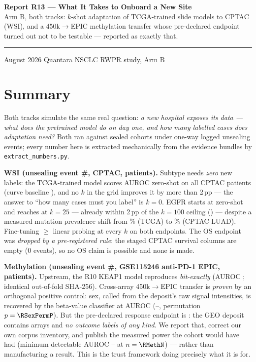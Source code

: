 \documentclass[11pt,a4paper]{article}
\begin{document}
\thispagestyle{empty}
\noindent
{\large\bfseries\color{qnavy} Report R13 --- What It Takes to Onboard a New Site}\\[2pt]
{\color{qgrey}Arm B, both tracks: $k$-shot adaptation of TCGA-trained slide models to CPTAC
(WSI), and a 450k$\rightarrow$EPIC methylation transfer whose pre-declared endpoint turned out
not to be testable --- reported as exactly that.}\\[6pt]
{\color{qgrey}\rule{\textwidth}{0.4pt}}

\medskip
{} August 2026 \quad\textbullet\quad Quantara \quad\textbullet\quad
NSCLC RWPR study, Arm B

\section*{Summary}

Both tracks simulate the same real question: \emph{a new hospital exposes its data --- what
does the pretrained model do on day one, and how many labelled cases does adaptation need?}
Both ran against sealed cohorts under one-way logged unsealing events; every number here is
extracted mechanically from the evidence bundles by \texttt{extract\_numbers.py}.

\textbf{WSI (unsealing event \#\RWsiUnsealNum, CPTAC, \RNCptacSubtype{} patients).} Subtype
needs \emph{zero} new labels: the TCGA-trained model scores AUROC \RSubZeroFull{} zero-shot on
all \RSubZeroFullN{} CPTAC patients (curve baseline \RSubFtZero), and no $k$ in the grid
improves it by more than 2\,pp --- the answer to ``how many cases must you label'' is
$k=0$. EGFR starts at \REgfrFtZero{} zero-shot and reaches \REgfrFtTwentyFive{} at
$k=25$ --- already within 2\,pp of the $k=100$ ceiling (\REgfrFtHundred) --- despite a
measured mutation-prevalence shift from \RShiftTcgaPct\% (TCGA) to \RShiftCptacPct\%
(CPTAC-LUAD). Fine-tuning $\geq$ linear probing at every $k$ on both endpoints. The OS
endpoint was \emph{dropped by a pre-registered rule}: the staged CPTAC survival columns are
empty (0 events), so no OS claim is possible and none is made.

\textbf{Methylation (unsealing event \#\RMethUnsealNum, GSE115246 anti-PD-1 EPIC,
\RMethN{} patients).} Upstream, the R10 KEAP1 model reproduces \emph{bit-exactly} (AUROC
\RReproAuroc; identical out-of-fold SHA-256). Cross-array 450k$\rightarrow$EPIC transfer is
\emph{proven} by an orthogonal positive control: sex, called from the deposit's raw signal
intensities, is recovered by the beta-value classifier at AUROC \RSexAuroc{}
(\RSexLo--\RSexHi, permutation $p=\RSexPermP$). But the pre-declared response endpoint is
\textbf{\REOneStatus}: the GEO deposit contains arrays and \emph{no outcome labels of any
kind}. We report that, correct our own corpus inventory, and publish the measured power the
cohort would have had (minimum detectable AUROC \RMdeMin--\RMdeMax{} at $n=\RMethN$) ---
rather than manufacturing a result. This is the trust framework doing precisely what it is
for.
\end{document}
